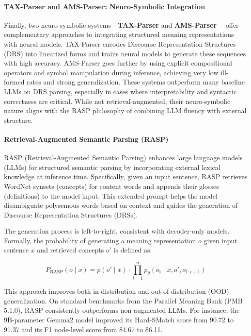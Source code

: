 \paragraph{TAX-Parser and AMS-Parser: Neuro-Symbolic Integration}

Finally, two neuro-symbolic systems—\textbf{TAX-Parser} \citep{zhang2024taxparser} and \textbf{AMS-Parser} \citep{yang2024amsparser}—offer complementary approaches to integrating structured meaning representations with neural models. TAX-Parser encodes Discourse Representation Structures (DRS) into linearized forms and trains neural models to generate these sequences with high accuracy. AMS-Parser goes further by using explicit compositional operators and symbol manipulation during inference, achieving very low ill-formed rates and strong generalization. These systems outperform many baseline LLMs on DRS parsing, especially in cases where interpretability and syntactic correctness are critical. While not retrieval-augmented, their neuro-symbolic nature aligns with the RASP philosophy of combining LLM fluency with external structure.

\paragraph{Retrieval-Augmented Semantic Parsing (RASP)}

RASP (Retrieval-Augmented Semantic Parsing) enhances large language models (LLMs) for structured semantic parsing by incorporating external lexical knowledge at inference time. Specifically, given an input sentence, RASP retrieves WordNet synsets (concepts) for content words and appends their glosses (definitions) to the model input. This extended prompt helps the model disambiguate polysemous words based on context and guides the generation of Discourse Representation Structures (DRSs).

The generation process is left-to-right, consistent with decoder-only models. Formally, the probability of generating a meaning representation \( o \) given input sentence \( x \) and retrieved concepts \( o' \) is defined as:

\[
P_{\text{RASP}}(o \mid x) = p(o' \mid x) \cdot \prod_{i=1}^{n} p_\theta(o_i \mid x, o', o_{1:i-1})
\]

This approach improves both in-distribution and out-of-distribution (OOD) generalization. On standard benchmarks from the Parallel Meaning Bank (PMB 5.1.0), RASP consistently outperforms non-augmented LLMs. For instance, the 9B-parameter Gemma2 model improved its Hard-SMatch score from 90.72 to 91.37 and its F1 node-level score from 84.67 to 86.11. 

